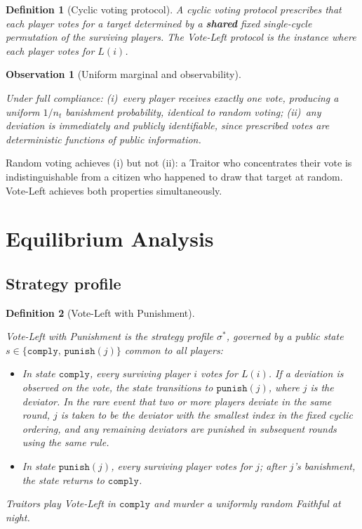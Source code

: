 \documentclass[11pt,a4paper]{article}
\newtheorem{definition}{Definition}
\newtheorem{observation}{Observation}
\begin{document}
\begin{definition}[Cyclic voting protocol]
    A \emph{cyclic voting protocol} prescribes that each player votes for a
    target determined by a \textbf{shared} fixed single-cycle permutation of the
    surviving players. The \emph{Vote-Left protocol} is the instance where each
    player votes for \(L(i)\).
\end{definition}

\begin{observation}[Uniform marginal and observability]\label{obs:main}

Under full compliance: (i)~every player receives exactly one vote, producing a
uniform \(1/n_t\) banishment probability, identical to random voting; (ii)~any
deviation is immediately and publicly identifiable, since prescribed votes are
deterministic functions of public information.

\end{observation}

Random voting achieves (i) but not (ii): a Traitor who concentrates their
vote is indistinguishable from a citizen who happened to draw that target
at random. Vote-Left achieves both properties simultaneously.

\section{Equilibrium Analysis}\label{sec:equilibrium}

\subsection{Strategy profile}

\begin{definition}[Vote-Left with Punishment]\label{def:equil}

Vote-Left with Punishment is the strategy profile \(\sigma^*\), governed by a
public state \(s \in \{\mathtt{comply},\, \mathtt{punish}(j)\}\) common to all
players:
\begin{itemize}[leftmargin=1.4em,itemsep=1pt,topsep=2pt]
    \item In state \(\mathtt{comply}\), every surviving player \(i\) votes for
  \(L(i)\). If a deviation is observed on the vote, the state transitions to
  \(\mathtt{punish}(j)\), where \(j\) is the deviator. In the rare event that
  two or more players deviate in the same round, \(j\) is taken to be the
  deviator with the smallest index in the fixed cyclic ordering, and any
  remaining deviators are punished in subsequent rounds using the same rule.
\item In state \(\mathtt{punish}(j)\), every surviving player votes for
  \(j\); after \(j\)'s banishment, the state returns to \(\mathtt{comply}\).
\end{itemize}
Traitors play Vote-Left in \(\mathtt{comply}\) and murder a uniformly random
Faithful at night.
\end{definition}
\end{document}
